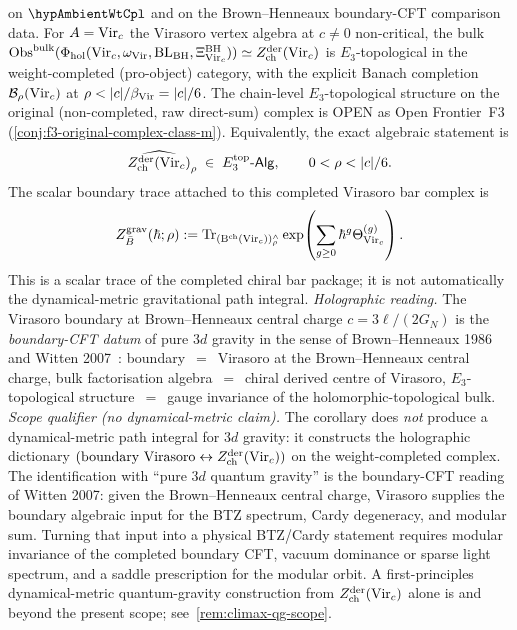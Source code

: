 \begin{corollary}
\ClaimStatusConditional{} on \(\hypAmbientWtCpl\) and on the
Brown--Henneaux boundary-CFT comparison data.
For $A = \mathrm{Vir}_{c}$ the Virasoro vertex algebra at $c \neq 0$
non-critical, the bulk
$\mathrm{Obs}^{\mathrm{bulk}}(\Phi_{\mathrm{hol}}(\mathrm{Vir}_{c},\omega_{\mathrm{Vir}},
\mathrm{BL}_{\mathrm{BH}},\Xi_{\mathrm{Vir}_c}^{\mathrm{BH}}))
\simeq Z^{\mathrm{der}}_{\mathrm{ch}}(\mathrm{Vir}_{c})$ is
$E_{3}$-topological in the weight-completed (pro-object)
category, with the explicit Banach completion
$\mathcal{B}_{\rho}(\mathrm{Vir}_{c})$ at
$\rho < |c|/\beta_{\mathrm{Vir}} = |c|/6$. The
chain-level $E_{3}$-topological structure on the original
(non-completed, raw direct-sum) complex is OPEN as Open
Frontier~F3 (\cref{conj:f3-original-complex-class-m}).
Equivalently, the exact algebraic statement is
\[
 \widehat{Z^{\mathrm{der}}_{\mathrm{ch}}(\mathrm{Vir}_c)}_{\rho}
 \;\in\;
 E_{3}^{\mathrm{top}}\text{-}\mathsf{Alg},
 \qquad
 0 < \rho < |c|/6.
\]
The scalar boundary trace attached to this completed Virasoro bar
complex is
\[
 Z_{\bar B}^{\mathrm{grav}}(\hbar;\rho)
 :=
 \operatorname{Tr}_{(\mathrm B^{\mathrm{ch}}(\mathrm{Vir}_c))^\wedge_{\rho}}
 \exp\!\left(\sum_{g\geq 0}\hbar^g\Theta^{(g)}_{\mathrm{Vir}_c}\right).
\]
This is a scalar trace of the completed chiral bar package; it is not
automatically the dynamical-metric gravitational path integral.
\emph{Holographic reading.} The Virasoro boundary at Brown--Henneaux
central charge $c = 3\ell/(2G_{N})$ is the \emph{boundary-CFT
datum} of pure $3d$ gravity in the sense of Brown--Henneaux 1986
\cite{BrownHenneaux} and Witten 2007~\cite{Witten2007}:
boundary~$=$~Virasoro at the Brown--Henneaux
central charge, bulk factorisation algebra~$=$~chiral derived
centre of Virasoro, $E_{3}$-topological structure~$=$~gauge
invariance of the holomorphic-topological bulk. \emph{Scope
qualifier (no dynamical-metric claim).} The corollary does
\emph{not} produce a dynamical-metric path integral for $3d$
gravity: it constructs the holographic dictionary
$(\text{boundary Virasoro} \leftrightarrow
Z^{\mathrm{der}}_{\mathrm{ch}}(\mathrm{Vir}_{c}))$ on the
weight-completed complex. The identification with ``pure $3d$
quantum gravity'' is the boundary-CFT reading of Witten 2007:
given the Brown--Henneaux central charge, Virasoro supplies the
boundary algebraic input for the BTZ spectrum, Cardy degeneracy,
and modular sum. Turning that input into a physical BTZ/Cardy
statement requires modular invariance of the completed boundary CFT,
vacuum dominance or sparse light spectrum, and a saddle prescription
for the modular orbit. A
first-principles dynamical-metric quantum-gravity construction
from $Z^{\mathrm{der}}_{\mathrm{ch}}(\mathrm{Vir}_{c})$ alone is
\ClaimStatusConjectured and beyond the present scope;
see~\cref{rem:climax-qg-scope}.
\end{corollary}

